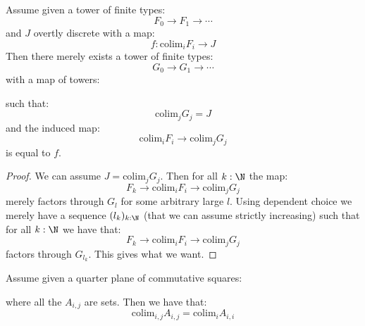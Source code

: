 \begin{lemma}\label{presentation-maps-overtly-discrete}
Assume given a tower of finite types:
\[F_0\to F_1\to \cdots\]
and $J$ overtly discrete with a map:
\[f:\mathrm{colim}_iF_i\to J\]
Then there merely exists a tower of finite types:
\[G_0\to G_1\to \cdots\]
with a map of towers:
\begin{center}
\end{center}
such that:
\[\mathrm{colim}_jG_j = J\]
and the induced map:
\[\mathrm{colim}_iF_i \to \mathrm{colim}_jG_j\]
is equal to $f$.
\end{lemma}

\begin{proof}
We can assume $J = \mathrm{colim}_jG_j$. Then for all $k:\N$ the map:
\[F_k\to \mathrm{colim}_iF_i \to \mathrm{colim}_jG_j\]
merely factors through $G_{l}$ for some arbitrary large $l$. Using dependent choice we merely have a sequence $(l_k)_{k:\N}$ (that we can assume strictly increasing) such that for all $k:\N$ we have that:
\[F_k\to \mathrm{colim}_iF_i \to \mathrm{colim}_jG_j\]
factors through $G_{l_k}$. This gives what we want.
\end{proof}

\begin{lemma}\label{colimit-quarter-diagonal}
Assume given a quarter plane of commutative squares:
\begin{center}
\end{center}
where all the $A_{i,j}$ are sets. Then we have that:
\[\mathrm{colim}_{i,j} A_{i,j} = \mathrm{colim}_iA_{i,i}\]
\end{lemma}

